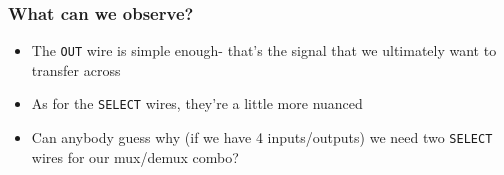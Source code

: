 \documentclass{beamer}
\begin{document}
    	\begin{frame}
    		\frametitle{What can we observe?}
    		\begin{itemize}
    			\item The \texttt{OUT} wire is simple enough- that's the signal that we ultimately want to transfer across
    			\item As for the \texttt{SELECT} wires, they're a little more nuanced 
    			\item Can anybody guess why (if we have 4 inputs/outputs) we need two \texttt{SELECT} wires for our mux/demux combo?
    		\end{itemize}
    		
    		


\begin{tikzpicture}[x=0.75pt,y=0.75pt,yscale=-1,xscale=1]


\end{tikzpicture}
\end{frame}
\end{document}
